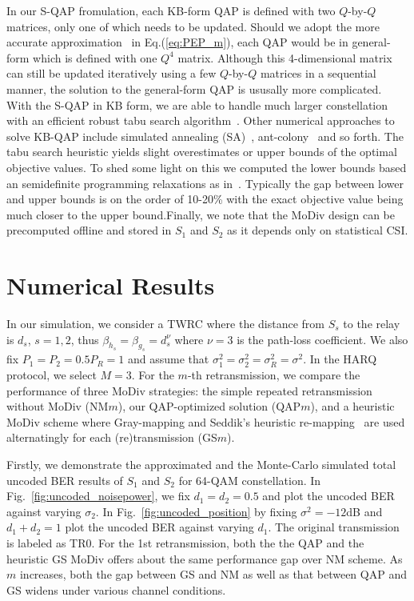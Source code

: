 \documentclass[journal]{IEEEtran}
\begin{document}
In our S-QAP fromulation, each KB-form QAP is defined with two $Q$-by-$Q$
matrices, only one of which needs to be updated. Should we adopt the more
accurate approximation~\cite{chiani2003new} in Eq.(\ref{eq:PEP_m}), each QAP
would be in general-form which is defined with one $Q^4$ matrix. Although this
4-dimensional matrix can still be updated iteratively using a few
$Q$-by-$Q$ matrices in a sequential manner, the solution to the general-form QAP
is ususally more complicated. With the S-QAP in KB form, we are able
to handle much larger constellation with an efficient robust tabu search
algorithm~\cite{taillard1991robust}. Other numerical approaches to
solve KB-QAP include simulated annealing (SA)~\cite{connolly1990improved},
ant-colony~\cite{gambardella1999ant} and so forth. The tabu search heuristic
yields slight overestimates or upper bounds of the optimal objective values. To
shed some light on this we computed the lower bounds based an semidefinite
programming relaxations as in~\cite{wu2011computation}. Typically the gap
between lower and upper bounds is on the order of 10-20\% with the exact
objective value being much closer to the upper bound.Finally, we note that the
MoDiv design can be precomputed offline and stored in $S_1$ and $S_2$ as it depends only on
statistical CSI.

\section{Numerical Results}
\label{sec:numerical}
In our simulation, we consider a TWRC where the distance from $S_s$ to the relay
is $d_s$, $s=1,2$, thus $\beta_{h_s} = \beta_{g_s} = d_s^{\nu}$ where $\nu=3$ is
the path-loss coefficient. We also fix $P_1=P_2=0.5P_R=1$ and assume that
$\sigma_1^2 = \sigma_2^2=\sigma_R^2 = \sigma^2$. In the HARQ protocol, we
select $M=3$. For the $m$-th
retransmission, we compare the performance of three MoDiv strategies: the simple
repeated retransmission without MoDiv (NM$m$), our QAP-optimized solution
(QAP$m$), and a heuristic MoDiv scheme where Gray-mapping and Seddik's heuristic
re-mapping~\cite{seddik2008trans} are used alternatingly for each
(re)transmission (GS$m$).

Firstly, we demonstrate the approximated and the Monte-Carlo simulated
total uncoded BER results of $S_1$ and $S_2$ for 64-QAM constellation. In
Fig.~\ref{fig:uncoded_noisepower}, we fix $d_1=d_2=0.5$ and plot the uncoded BER
against varying $\sigma_2$. In Fig.~\ref{fig:uncoded_position} by fixing
$\sigma^2=-12$dB and $d_1+d_2=1$ plot the uncoded BER against varying $d_1$. The
original transmission is labeled as TR0. For the 1st retransmission, both the
the QAP and the heuristic GS MoDiv offers about the same performance gap over NM
scheme. As $m$ increases, both the gap between GS and NM as well as that
between QAP and GS widens under various channel conditions.
\end{document}
